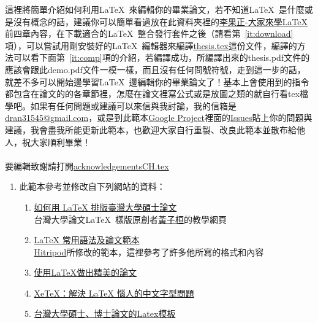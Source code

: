 \begin{acknowledgementsCH}
 這裡將簡單介紹如何利用\LaTeX\ 來編輯你的畢業論文，若不知道\LaTeX\ 是什麼或是沒有概念的話，建議你可以簡單看過放在此資料夾裡的\href{run:./latex123.pdf}{李果正-大家來學\LaTeX}前四章內容，在下載適合的\LaTeX\ 整合發行套件之後（請看第~\ref{it:download}項），可以嘗試用剛安裝好的\LaTeX\ 編輯器來編譯\href{run:./thesis.tex}{thesis.tex}這份文件，編譯的方法可以看下面第~\ref{it:comp}項的介紹，若編譯成功，所編譯出來的thesis.pdf文件的應該會跟此demo.pdf文件一模一樣，而且沒有任何問號符號，走到這一步的話，就差不多可以開始邊學習\LaTeX\ 邊編輯你的畢業論文了！基本上會使用到的指令都包含在論文的的各章節裡，怎麼在論文裡寫公式或是放圖之類的就自行看tex檔學吧。如果有任何問題或建議可以來信與我討論，我的信箱是\href{mailto:dran31545@gmail.com}{dran31545@gmail.com}，或是到此範本\href{http://code.google.com/p/ntu-thesis-latex-template/}{Google Project}裡面的\href{http://code.google.com/p/ntu-thesis-latex-template/issues/list}{Issues}貼上你的問題與建議，我會盡我所能更新此範本，也歡迎大家自行重製、改良此範本並散布給他人，祝大家順利畢業！\\\\
 要編輯致謝請打開\href{run:./acknowledgementsCH.tex}{acknowledgementsCH.tex}\\
 \begin{enumerate}[leftmargin=0pt, topsep=0pt, itemsep=0pt, label=\Roman{*}.]
\item 此範本參考並修改自下列網站的資料：
\begin{enumerate}[topsep=0pt, itemsep=0pt, label=$\bullet$]
    \item \href{http://www.csie.ntu.edu.tw/~tzhuan/www/resources/ntu/}{如何用 LaTeX 排版臺灣大學碩士論文}\\
    \textemdash 台灣大學論文\LaTeX\ 樣版原創者\href{http://www.csie.ntu.edu.tw/~tzhuan/www/}{黃子桓}的教學網頁
    \item \href{http://www.hitripod.com/blog/2012/05/latex-thesis-template-quick-reference/}{LaTeX 常用語法及論文範本}\\
    \textemdash \href{http://www.hitripod.com/blog/}{Hitripod}所修改的範本，這裡參考了許多他所寫的格式和內容
    \item \href{http://www.cc.ntu.edu.tw/chinese/epaper/0014/20100920_1404.htm}{使用LaTeX做出精美的論文}
    \item \href{http://www.hitripod.com/blog/2011/04/xetex-chinese-font-cjk-latex/}{XeTeX：解決 LaTeX 惱人的中文字型問題}
    \item \href{http://code.google.com/p/ntuthesis/}{台灣大學碩士、博士論文的Latex模板}\\

\end{enumerate}
\end{enumerate}
\end{acknowledgementsCH}

